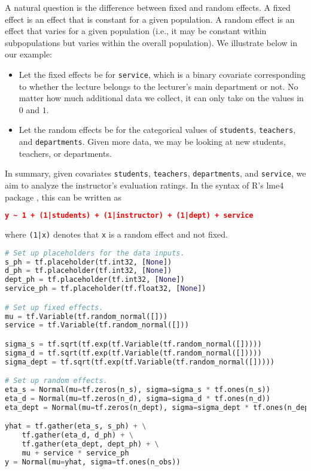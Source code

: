 A natural question is the difference between fixed and random effects.
A fixed effect is an effect that is constant for a given population. A
random effect is an effect that varies for a given population (i.e.,
it may be constant within subpopulations but varies within the overall
population). We illustrate below in our example:

\begin{itemize}
\item
Let the fixed effects be for \texttt{service}, which is a binary
covariate corresponding to whether the lecture belongs to the
lecturer's main department or not. No matter how much additional data
we collect, it can only take on the values in $0$ and $1$.
\item
Let the random effects be for the categorical values of
\texttt{students}, \texttt{teachers}, and \texttt{departments}. Given
more data, we may be looking at new students, teachers, or
departments.
\end{itemize}

In summary, given covariates \texttt{students}, \texttt{teachers},
\texttt{departments}, and \texttt{service}, we aim to analyze the
instructor's evaluation ratings. In the syntax of R's lme4 package
\citep{bates2015fitting}, this can be written as

\begin{lstlisting}[language=JSON]
y ~ 1 + (1|students) + (1|instructor) + (1|dept) + service
\end{lstlisting}
where \texttt{(1|x)} denotes that \texttt{x} is a random effect and not
fixed.

\begin{lstlisting}[language=Python]
# Set up placeholders for the data inputs.
s_ph = tf.placeholder(tf.int32, [None])
d_ph = tf.placeholder(tf.int32, [None])
dept_ph = tf.placeholder(tf.int32, [None])
service_ph = tf.placeholder(tf.float32, [None])

# Set up fixed effects.
mu = tf.Variable(tf.random_normal([]))
service = tf.Variable(tf.random_normal([]))

sigma_s = tf.sqrt(tf.exp(tf.Variable(tf.random_normal([]))))
sigma_d = tf.sqrt(tf.exp(tf.Variable(tf.random_normal([]))))
sigma_dept = tf.sqrt(tf.exp(tf.Variable(tf.random_normal([]))))

# Set up random effects.
eta_s = Normal(mu=tf.zeros(n_s), sigma=sigma_s * tf.ones(n_s))
eta_d = Normal(mu=tf.zeros(n_d), sigma=sigma_d * tf.ones(n_d))
eta_dept = Normal(mu=tf.zeros(n_dept), sigma=sigma_dept * tf.ones(n_dept))

yhat = tf.gather(eta_s, s_ph) + \
    tf.gather(eta_d, d_ph) + \
    tf.gather(eta_dept, dept_ph) + \
    mu + service * service_ph
y = Normal(mu=yhat, sigma=tf.ones(n_obs))
\end{lstlisting}

